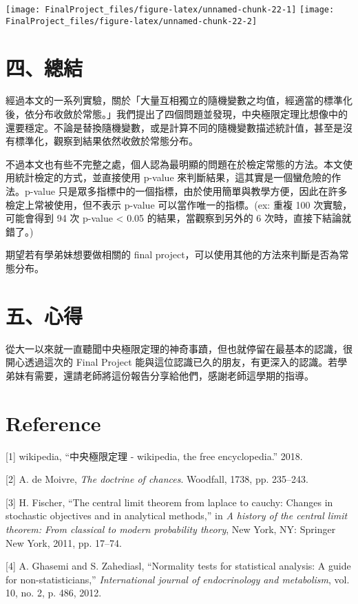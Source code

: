 \documentclass[]{article}
\begin{document}
\texttt{[image: FinalProject\_files/figure-latex/unnamed-chunk-22-1]}
\texttt{[image: FinalProject\_files/figure-latex/unnamed-chunk-22-2]}

\section{四、總結}

經過本文的一系列實驗，關於「大量互相獨立的隨機變數之均值，經適當的標準化後，依分布收斂於常態。」我們提出了四個問題並發現，中央極限定理比想像中的還要穩定。不論是替換隨機變數，或是計算不同的隨機變數描述統計值，甚至是沒有標準化，觀察到結果依然收斂於常態分布。

不過本文也有些不完整之處，個人認為最明顯的問題在於檢定常態的方法。本文使用統計檢定的方式，並直接使用
p-value 來判斷結果，這其實是一個蠻危險的作法。p-value
只是眾多指標中的一個指標，由於使用簡單與教學方便，因此在許多檢定上常被使用，但不表示
p-value 可以當作唯一的指標。(ex: 重複 100 次實驗，可能會得到 94 次
p-value \textless{} 0.05 的結果，當觀察到另外的 6
次時，直接下結論就錯了。)

期望若有學弟妹想要做相關的 final
project，可以使用其他的方法來判斷是否為常態分布。

\section{五、心得}

從大一以來就一直聽聞中央極限定理的神奇事蹟，但也就停留在最基本的認識，很開心透過這次的
Final Project
能與這位認識已久的朋友，有更深入的認識。若學弟妹有需要，還請老師將這份報告分享給他們，感謝老師這學期的指導。

\hypertarget{reference}{%
\section*{Reference}\label{reference}}

\hypertarget{refs}{}
\leavevmode\hypertarget{ref-wiki:xxx}{}%
{[}1{]} wikipedia, ``中央極限定理 - wikipedia, the free encyclopedia.''
2018.

\leavevmode\hypertarget{ref-de1738doctrine}{}%
{[}2{]} A. de Moivre, \emph{The doctrine of chances}. Woodfall, 1738,
pp. 235--243.

\leavevmode\hypertarget{ref-Fischer2011}{}%
{[}3{]} H. Fischer, ``The central limit theorem from laplace to cauchy:
Changes in stochastic objectives and in analytical methods,'' in \emph{A
history of the central limit theorem: From classical to modern
probability theory}, New York, NY: Springer New York, 2011, pp. 17--74.

\leavevmode\hypertarget{ref-ghasemi2012normality}{}%
{[}4{]} A. Ghasemi and S. Zahediasl, ``Normality tests for statistical
analysis: A guide for non-statisticians,'' \emph{International journal
of endocrinology and metabolism}, vol. 10, no. 2, p. 486, 2012.
\end{document}
